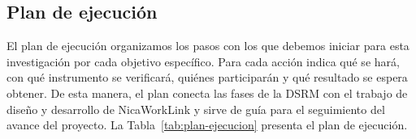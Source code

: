 \subsection{Plan de ejecución}

El plan de ejecución organizamos los pasos con los que debemos iniciar para esta investigación por cada objetivo específico. Para cada acción indica qué se hará, con qué instrumento se verificará, quiénes participarán y qué resultado se espera obtener. De esta manera, el plan conecta las fases de la DSRM con el trabajo de diseño y desarrollo de NicaWorkLink y sirve de guía para el seguimiento del avance del proyecto. La Tabla~\ref{tab:plan-ejecucion} presenta el plan de ejecución.

